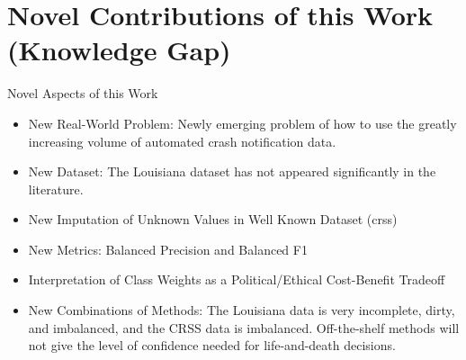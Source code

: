 \section{Novel Contributions of this Work (Knowledge Gap)}

Novel Aspects of this Work

\begin{itemize}
	\item New Real-World Problem:  Newly emerging problem of how to use the greatly increasing volume of automated crash notification data.
	\item New Dataset:  The Louisiana dataset has not appeared significantly in the literature.
	\item New Imputation of Unknown Values in Well Known Dataset (\acrshort{crss})
	\item New Metrics:  Balanced Precision and Balanced F1
	\item Interpretation of Class Weights as a Political/Ethical Cost-Benefit Tradeoff
	\item New Combinations of Methods:  The Louisiana data is very incomplete, dirty, and imbalanced, and the CRSS data is imbalanced.  Off-the-shelf methods will not give the level of confidence needed for life-and-death decisions.  
\end{itemize}